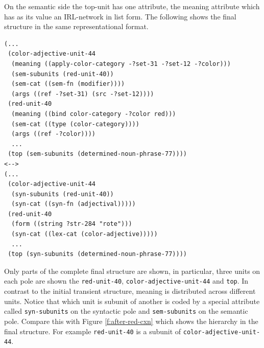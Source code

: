 On the semantic side the top-unit has one attribute, the meaning attribute
which has as its value an IRL-network in list form. 
The following shows the final structure in the same representational 
format.
\begin{footnotesize}
\begin{verbatim}
(...
 (color-adjective-unit-44
  (meaning ((apply-color-category -?set-31 -?set-12 -?color)))
  (sem-subunits (red-unit-40))
  (sem-cat ((sem-fn (modifier))))
  (args ((ref -?set-31) (src -?set-12))))
 (red-unit-40
  (meaning ((bind color-category -?color red)))
  (sem-cat ((type (color-category))))
  (args ((ref -?color))))
  ...
 (top (sem-subunits (determined-noun-phrase-77))))
<-->
(...
 (color-adjective-unit-44
  (syn-subunits (red-unit-40))
  (syn-cat ((syn-fn (adjectival)))))
 (red-unit-40
  (form ((string ?str-284 "rote")))
  (syn-cat ((lex-cat (color-adjective)))))
  ...
 (top (syn-subunits (determined-noun-phrase-77))))
\end{verbatim}
\end{footnotesize}
Only parts of the complete final structure are shown,
in particular, three units on each pole are shown the 
{\footnotesize\tt red-unit-40}, {\footnotesize\tt color-adjective-unit-44}
and {\footnotesize\tt top}. In contrast to the initial transient structure,
meaning is distributed across different units.
Notice that which unit is subunit of another is coded by a special
attribute called {\footnotesize\tt syn-subunits} on the syntactic pole
and {\footnotesize\tt sem-subunits} on the semantic pole. Compare
this with Figure \ref{f:after-red-cxn} which shows the hierarchy in the final 
structure. For example {\footnotesize\tt red-unit-40} is a subunit of 
{\footnotesize\tt color-adjective-unit-44}.

